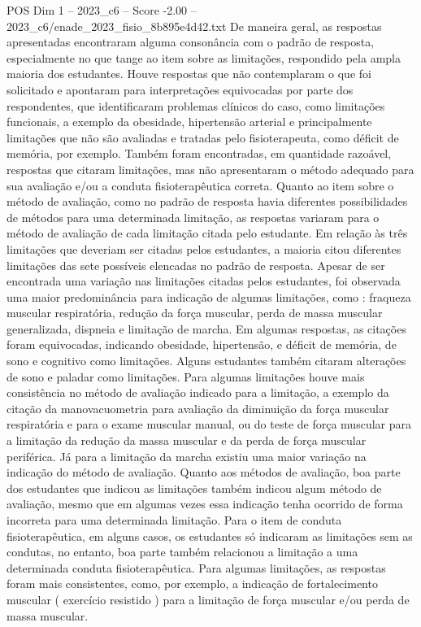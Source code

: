 \begin{textsample}{POS Dim 1 – 2023\_c6 – Score -2.00 – 2023\_c6/enade\_2023\_fisio\_8b895e4d42.txt}
De maneira geral, as respostas apresentadas encontraram alguma consonância com o padrão de resposta, especialmente no que tange ao item sobre as limitações, respondido pela ampla maioria dos estudantes.
Houve respostas que não contemplaram o que foi solicitado e apontaram para interpretações equivocadas por parte dos respondentes, que identificaram problemas clínicos do caso, como limitações funcionais, a exemplo da obesidade, hipertensão arterial e principalmente limitações que não são avaliadas e tratadas pelo fisioterapeuta, como déficit de memória, por exemplo.
Também foram encontradas, em quantidade razoável, respostas que citaram limitações, mas não apresentaram o método adequado para sua avaliação e/ou a conduta fisioterapêutica correta.
Quanto ao item sobre o método de avaliação, como no padrão de resposta havia diferentes possibilidades de métodos para uma determinada limitação, as respostas variaram para o método de avaliação de cada limitação citada pelo estudante.
Em relação às três limitações que deveriam ser citadas pelos estudantes, a maioria citou diferentes limitações das sete possíveis elencadas no padrão de resposta.
Apesar de ser encontrada uma variação nas limitações citadas pelos estudantes, foi observada uma maior predominância para indicação de algumas limitações, como : fraqueza muscular respiratória, redução da força muscular, perda de massa muscular generalizada, dispneia e limitação de marcha.
Em algumas respostas, as citações foram equivocadas, indicando obesidade, hipertensão, e déficit de memória, de sono e cognitivo como limitações.
Alguns estudantes também citaram alterações de sono e paladar como limitações.
Para algumas limitações houve mais consistência no método de avaliação indicado para a limitação, a exemplo da citação da manovacuometria para avaliação da diminuição da força muscular respiratória e para o exame muscular manual, ou do teste de força muscular para a limitação da redução da massa muscular e da perda de força muscular periférica.
Já para a limitação da marcha existiu uma maior variação na indicação do método de avaliação.
Quanto aos métodos de avaliação, boa parte dos estudantes que indicou as limitações também indicou algum método de avaliação, mesmo que em algumas vezes essa indicação tenha ocorrido de forma incorreta para uma determinada limitação.
Para o item de conduta fisioterapêutica, em alguns casos, os estudantes só indicaram as limitações sem as condutas, no entanto, boa parte também relacionou a limitação a uma determinada conduta fisioterapêutica.
Para algumas limitações, as respostas foram mais consistentes, como, por exemplo, a indicação de fortalecimento muscular ( exercício resistido ) para a limitação de força muscular e/ou perda de massa muscular.

\end{textsample}
